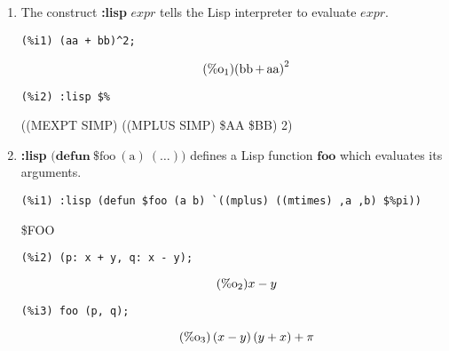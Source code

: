 \documentclass[12pt,leqno]{article}
\begin{document}
\begin{enumerate}

\item The construct {\bf :lisp} $\mathit{expr}$ tells the Lisp interpreter
to evaluate $\mathit{expr}$.
\begin{verbatim}
(%i1) (aa + bb)^2;
\end{verbatim}
\begin{equation}
\tag{$\mathop{\mathrm{\%o}}_{1}$}{\left(\mathop{\mathrm{bb}}+\mathop{\mathrm{aa}}\right)}^{2}
\label{eq:doc-group1-code36-1-1}
\end{equation}
\begin{verbatim}
(%i2) :lisp $%
\end{verbatim}
((MEXPT SIMP) ((MPLUS SIMP) \$AA \$BB) 2)


\item {\bf :lisp} $\mathrm{(}\mathbf{defun\ } \mathrm{\$foo\ (a)\ (\ldots))}$
defines a Lisp function $\mathbf{foo}$ which evaluates its arguments.
\begin{verbatim}
(%i1) :lisp (defun $foo (a b) `((mplus) ((mtimes) ,a ,b) $%pi))
\end{verbatim}
\$FOO
\begin{verbatim}
(%i2) (p: x + y, q: x - y);
\end{verbatim}
\begin{equation}
\tag{$\mathop{\mathrm{\%o}}_{2}$}x-y
\label{eq:doc-group1-code37-2-1}
\end{equation}
\begin{verbatim}
(%i3) foo (p, q);
\end{verbatim}
\begin{equation}
\tag{$\mathop{\mathrm{\%o}}_{3}$}\left(x-y\right) \left(y+x\right)+\pi
\label{eq:doc-group1-code37-3-1}
\end{equation}



\end{enumerate}
\end{document}
